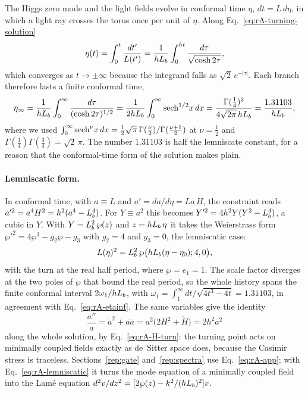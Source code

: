 The Higgs zero mode and the light fields evolve in conformal time $\eta$, $dt=L\,d\eta$, in which a light ray crosses the torus once per unit of $\eta$.
Along Eq.~\eqref{eq:rA-turning-solution}
\begin{equation}
\eta(t)=\int_0^t\frac{dt'}{L(t')}=\frac{1}{hL_b}\int_0^{ht}\frac{d\tau}{\sqrt{\cosh2\tau}} ,
\end{equation}
which converges as $t\to\pm\infty$ because the integrand falls as $\sqrt2\,e^{-|\tau|}$.
Each branch therefore lasts a finite conformal time,
\begin{equation}
\eta_\infty=\frac{1}{hL_b}\int_0^\infty\frac{d\tau}{(\cosh2\tau)^{1/2}}=\frac{1}{2hL_b}\int_0^\infty{\rm sech}^{1/2}x\,dx=\frac{\Gamma(\tfrac14)^2}{4\sqrt{2\pi}\,hL_b}=\frac{1.31103}{hL_b},
\label{eq:rA-etainf}
\end{equation} %
where we used $\int_0^\infty{\rm sech}^\nu x\,dx=\tfrac12\sqrt\pi\,\Gamma(\tfrac\nu2)/\Gamma(\tfrac{\nu+1}2)$ at $\nu=\tfrac12$ and $\Gamma(\tfrac14)\Gamma(\tfrac34)=\sqrt2\,\pi$.
The number $1.31103$ is half the lemniscate constant, for a reason that the conformal-time form of the solution makes plain.

\paragraph{Lemniscatic form.}
In conformal time, with $a\equiv L$ and $a'=da/d\eta=La\,H$, the constraint reads $a'^2=a^4H^2=h^2(a^4-L_b^4)$.
For $Y\equiv a^2$ this becomes $Y'^2=4h^2Y(Y^2-L_b^4)$, a cubic in $Y$.
With $Y=L_b^2\,\wp(z)$ and $z=hL_b\,\eta$ it takes the Weierstrass form $\wp'^2=4\wp^3-g_2\wp-g_3$ with $g_2=4$ and $g_3=0$, the lemniscatic case:
\begin{equation}
L(\eta)^2=L_b^2\,\wp\big(hL_b(\eta-\eta_0);4,0\big),
\label{eq:rA-lemniscatic}
\end{equation}
with the turn at the real half period, where $\wp=e_1=1$.
The scale factor diverges at the two poles of $\wp$ that bound the real period, so the whole history spans the finite conformal interval $2\omega_1/hL_b$, with $\omega_1=\int_1^\infty dt/\sqrt{4t^3-4t}=1.31103$, in agreement with Eq.~\eqref{eq:rA-etainf}. %
The same variables give the identity
\begin{equation}
\frac{a''}{a}=\dot a^2+a\ddot a=a^2\big(2H^2+\dot H\big)=2h^2a^2
\label{eq:rA-app}
\end{equation}
along the whole solution, by Eq.~\eqref{eq:rA-H-turn}: the turning point acts on minimally coupled fields exactly as de~Sitter space does, because the Casimir stress is traceless.
Sections~\ref{rep:gate} and~\ref{rep:spectra} use Eq.~\eqref{eq:rA-app}; with Eq.~\eqref{eq:rA-lemniscatic} it turns the mode equation of a minimally coupled field into the Lam\'e equation $d^2v/dz^2=[2\wp(z)-k^2/(hL_b)^2]v$.

